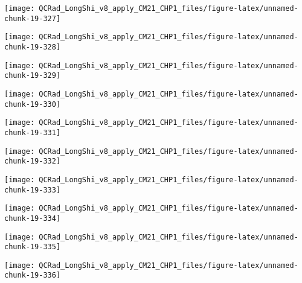 \documentclass[
  10pt,
  a4paper,oneside]{article}
\begin{document}
\begin{center}\texttt{[image: QCRad\_LongShi\_v8\_apply\_CM21\_CHP1\_files/figure-latex/unnamed-chunk-19-327]} \end{center}

\begin{center}\texttt{[image: QCRad\_LongShi\_v8\_apply\_CM21\_CHP1\_files/figure-latex/unnamed-chunk-19-328]} \end{center}

\begin{center}\texttt{[image: QCRad\_LongShi\_v8\_apply\_CM21\_CHP1\_files/figure-latex/unnamed-chunk-19-329]} \end{center}

\begin{center}\texttt{[image: QCRad\_LongShi\_v8\_apply\_CM21\_CHP1\_files/figure-latex/unnamed-chunk-19-330]} \end{center}

\begin{center}\texttt{[image: QCRad\_LongShi\_v8\_apply\_CM21\_CHP1\_files/figure-latex/unnamed-chunk-19-331]} \end{center}

\begin{center}\texttt{[image: QCRad\_LongShi\_v8\_apply\_CM21\_CHP1\_files/figure-latex/unnamed-chunk-19-332]} \end{center}

\begin{center}\texttt{[image: QCRad\_LongShi\_v8\_apply\_CM21\_CHP1\_files/figure-latex/unnamed-chunk-19-333]} \end{center}

\begin{center}\texttt{[image: QCRad\_LongShi\_v8\_apply\_CM21\_CHP1\_files/figure-latex/unnamed-chunk-19-334]} \end{center}

\begin{center}\texttt{[image: QCRad\_LongShi\_v8\_apply\_CM21\_CHP1\_files/figure-latex/unnamed-chunk-19-335]} \end{center}

\begin{center}\texttt{[image: QCRad\_LongShi\_v8\_apply\_CM21\_CHP1\_files/figure-latex/unnamed-chunk-19-336]} \end{center}
\end{document}
